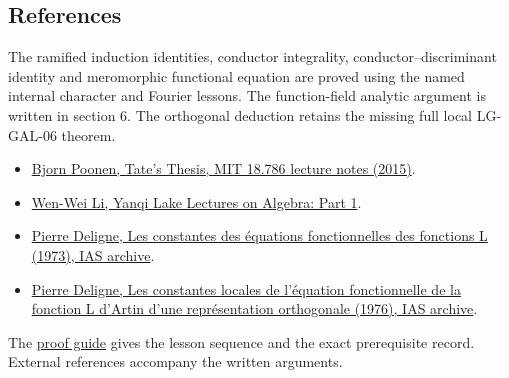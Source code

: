 \documentclass[11pt,a4paper]{article}
\newcommand{\tightlist}{\setlength{\itemsep}{0pt}\setlength{\parskip}{0pt}}
\begin{document}
\subsection{References}\label{references}

The ramified induction identities, conductor integrality,
conductor--discriminant identity and meromorphic functional equation are
proved using the named internal character and Fourier lessons. The
function-field analytic argument is written in section 6. The orthogonal
deduction retains the missing full local LG-GAL-06 theorem.

\begin{itemize}
\tightlist
\item
  \href{https://math.mit.edu/~poonen/786/notes.pdf}{Bjorn Poonen, Tate's
  Thesis, MIT 18.786 lecture notes (2015)}.
\item
  \href{https://www.wwli.asia/downloads/YAlg1.pdf}{Wen-Wei Li, Yanqi
  Lake Lectures on Algebra: Part 1}.
\item
  \href{https://publications.ias.edu/sites/default/files/Number20.pdf}{Pierre
  Deligne, Les constantes des équations fonctionnelles des fonctions L
  (1973), IAS archive}.
\item
  \href{https://publications.ias.edu/sites/default/files/Number26.pdf}{Pierre
  Deligne, Les constantes locales de l'équation fonctionnelle de la
  fonction L d'Artin d'une représentation orthogonale (1976), IAS
  archive}.
\end{itemize}

The \href{../free-proofs.html}{proof guide} gives the lesson sequence
and the exact prerequisite record. External references accompany the
written arguments.
\end{document}
